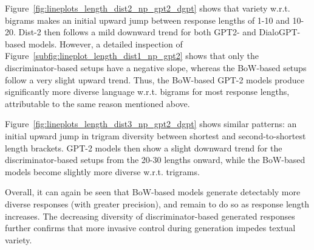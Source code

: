 Figure~\ref{fig:lineplots_length_dist2_np_gpt2_dgpt} shows that variety w.r.t. bigrams makes an initial upward jump between response lengths of 1-10 and 10-20. Dist-2 then follows a mild downward trend for both GPT2- and DialoGPT-based models. However, a detailed inspection of Figure~\ref{subfig:lineplot_length_dist1_np_gpt2} shows that only the discriminator-based setups have a negative slope, whereas the BoW-based setups follow a very slight upward trend. Thus, the BoW-based GPT-2 models produce significantly more diverse language w.r.t. bigrams for most response lengths, attributable to the same reason mentioned above.

Figure~\ref{fig:lineplots_length_dist3_np_gpt2_dgpt} shows similar patterns: an initial upward jump in trigram diversity between shortest and second-to-shortest length brackets. GPT-2 models then show a slight downward trend for the discriminator-based setups from the 20-30 lengths onward, while the BoW-based models become slightly more diverse w.r.t. trigrams.

Overall, it can again be seen that BoW-based models generate detectably more diverse responses (with greater precision), and remain to do so as response length increases. The decreasing diversity of discriminator-based generated responses further confirms that more invasive control during generation impedes textual variety.


